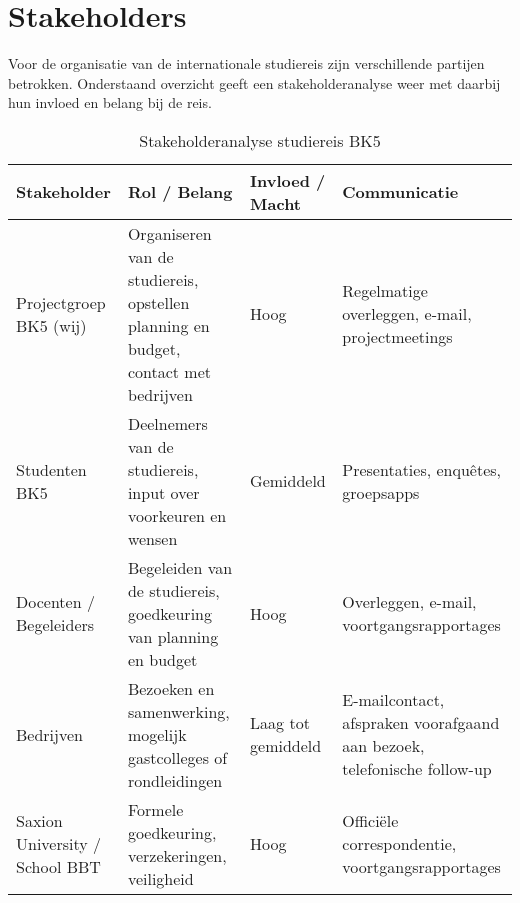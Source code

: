 \section{Stakeholders}

Voor de organisatie van de internationale studiereis zijn verschillende partijen betrokken. Onderstaand overzicht geeft een stakeholderanalyse weer met daarbij hun invloed en belang bij de reis.

\vspace{1cm}

\begin{table}[h!]
	\centering
	\caption{Stakeholderanalyse studiereis BK5}
	\label{tab:stakeholders}
	\begin{tabular}{|l|p{4.5cm}|l|p{4.5cm}|}
		\hline
		\textbf{Stakeholder} & \textbf{Rol / Belang} & \textbf{Invloed / Macht} & \textbf{Communicatie} \\
		\hline
		Projectgroep BK5 (wij) & Organiseren van de studiereis, opstellen planning en budget, contact met bedrijven & Hoog & Regelmatige overleggen, e-mail, projectmeetings \\
		\hline
		Studenten BK5 & Deelnemers van de studiereis, input over voorkeuren en wensen & Gemiddeld & Presentaties, enquêtes, groepsapps \\
		\hline
		Docenten / Begeleiders & Begeleiden van de studiereis, goedkeuring van planning en budget & Hoog & Overleggen, e-mail, voortgangsrapportages \\
		\hline
		Bedrijven & Bezoeken en samenwerking, mogelijk gastcolleges of rondleidingen & Laag tot gemiddeld & E-mailcontact, afspraken voorafgaand aan bezoek, telefonische follow-up \\
		\hline
		Saxion University / School BBT & Formele goedkeuring, verzekeringen, veiligheid & Hoog & Officiële correspondentie, voortgangsrapportages \\
		\hline
	\end{tabular}
	
\end{table}
